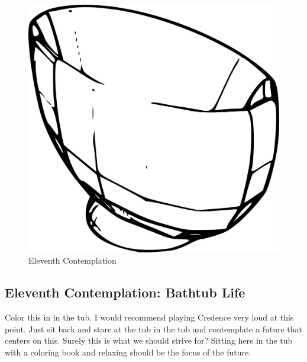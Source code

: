 \begin{figure}[htbp]
\centering
\includegraphics{images/contemplations/contemplation11C.png}
\caption{Eleventh Contemplation}
\end{figure}

\subsection{Eleventh Contemplation: Bathtub
Life}\label{eleventh-contemplation-bathtub-life}

Color this in in the tub. I would recommend playing Credence very loud
at this point. Just sit back and stare at the tub in the tub and
contemplate a future that centers on this. Surely this is what we should
strive for? Sitting here in the tub with a coloring book and relaxing
should be the focus of the future.
